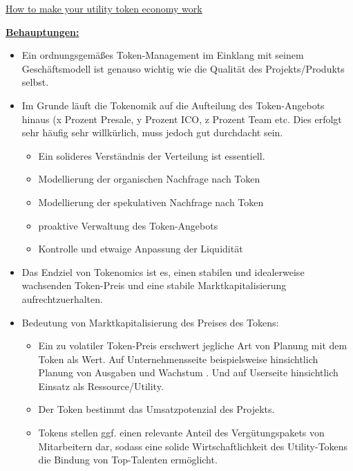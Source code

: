 

\vspace{0.3cm}

\begin{Zitat*}

\href{https://blog.stobox.io/how-to-make-your-utility-token-economy-work/}{How to make your utility token economy work}

\vspace{0.2cm}

\underline{\textbf{Behauptungen:}}

\begin{itemize}
  \item Ein ordnungsgemäßes Token-Management im Einklang mit seinem Geschäftsmodell ist genauso wichtig wie die Qualität des Projekts/Produkts selbst.
  \item Im Grunde läuft die Tokenomik auf die Aufteilung des Token-Angebots hinaus (x Prozent Presale, y Prozent ICO, z Prozent Team etc. Dies erfolgt sehr häufig sehr willkürlich, muss jedoch gut durchdacht sein.
  \begin{itemize}
  	\item Ein solideres Verständnis der Verteilung ist essentiell.
  	\item Modellierung der organischen Nachfrage nach Token
  	\item Modellierung der spekulativen Nachfrage nach Token
  	\item proaktive Verwaltung des Token-Angebots
  	\item Kontrolle und etwaige Anpassung der Liquidität
  \end{itemize}
  \item Das Endziel von Tokenomics ist es, einen stabilen und idealerweise wachsenden Token-Preis und eine stabile Marktkapitalisierung aufrechtzuerhalten.
  \item Bedeutung von Marktkapitalisierung des Preises des Tokens:
  \begin{itemize}
  	\item Ein zu volatiler Token-Preis erschwert jegliche Art von Planung mit dem Token als Wert. Auf Unternehmensseite beispielsweise hinsichtlich Planung von Ausgaben und Wachstum . Und auf Userseite hinsichtlich Einsatz als Ressource/Utility.
  	\item Der Token bestimmt das Umsatzpotenzial des Projekts.
  	\item Tokens stellen ggf. einen relevante Anteil des Vergütungspakets von Mitarbeitern dar, sodass eine solide Wirtschaftlichkeit des Utility-Tokens die Bindung von Top-Talenten ermöglicht. 
  \end{itemize}
\end{itemize}

\end{Zitat*}

\vspace{0.5cm}
